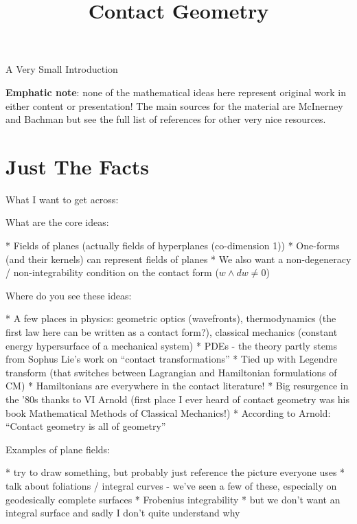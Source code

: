 \documentclass{article}
\begin{document}
\title {Contact Geometry}
\maketitle

\centerline{\sc \large A Very Small Introduction }
\onehalfspace

\tableofcontents

\newpage

\textbf{Emphatic note}: none of the mathematical ideas here represent original work in
either content or presentation! The main sources for the material are McInerney
\cite{mcinerney} and Bachman \cite{bachman} but see the full list of references for other very nice resources.

\newpage

\section {Just The Facts}

What I want to get across:

What are the core ideas:

* Fields of planes (actually fields of hyperplanes (co-dimension 1))
* One-forms (and their kernels) can represent fields of planes
* We also want a non-degeneracy / non-integrability condition on the contact
form ($w \wedge dw \neq 0$)

Where do you see these ideas:

* A few places in physics: geometric optics (wavefronts), thermodynamics (the
first law here can be written as a contact form?), classical mechanics (constant
energy hypersurface of a mechanical system)
* PDEs - the theory partly stems from Sophus Lie's work on ``contact transformations''
* Tied up with Legendre transform (that switches between Lagrangian and
Hamiltonian formulations of CM)
* Hamiltonians are everywhere in the contact literature!
* Big resurgence in the '80s thanks to VI Arnold (first place I ever heard of
contact geometry was his book Mathematical Methods of Classical Mechanics!)
* According to Arnold: ``Contact geometry is all of geometry''

Examples of plane fields:

* try to draw something, but probably just reference the picture everyone uses
* talk about foliations / integral curves - we've seen a few of these,
especially on geodesically complete surfaces
* Frobenius integrability
* but we don't want an integral surface and sadly I don't quite understand why
\end{document}
